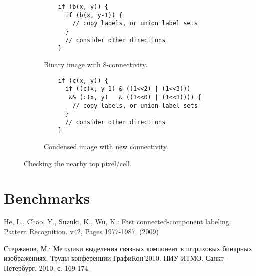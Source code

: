 \documentclass{llncs}
\begin{document}
\begin{figure}
  \centering
  \begin{subfigure}[t]{0.475\linewidth}
    \centering
    \begin{lstlisting}
    if (b(x, y)) {
      if (b(x, y-1)) {
        // copy labels, or union label sets
      }
      // consider other directions
    }
    \end{lstlisting}
    \caption{Binary image with 8-connectivity.}
  \end{subfigure}
  \quad
  \begin{subfigure}[t]{0.475\linewidth}
    \centering
    \begin{lstlisting}
    if (c(x, y)) {
      if ((c(x, y-1) & ((1<<2) | (1<<3)))
       && (c(x, y)   & ((1<<0) | (1<<1)))) {
        // copy labels, or union label sets
      }
      // consider other directions
    }
    \end{lstlisting}
    \caption{Condensed image with new connectivity.}
  \end{subfigure}
  \caption{Checking the nearby top pixel/cell.}
  \label{fig:connectivity:code}
\end{figure}

\section{Benchmarks}

\newcommand{\inputtable}[2]{
  \begin{table}
    \centering
    
    \caption{Noise images $#1 \times #2$ px}
  \end{table} }

\inputtable{400}{600}
\inputtable{800}{1200}
\inputtable{1200}{1800}
\inputtable{2000}{3000}
\inputtable{4000}{6000}

\begin{thebibliography}{5}

He, L., Chao, Y., Suzuki, K., Wu, K.:
Fast connected-component labeling. Pattern Recognition. v42, Pages 1977-1987. (2009)

Стержанов, М.:
Методики выделения связных компонент в штриховых бинарных изображениях.
Труды конференции ГрафиКон’2010. НИУ ИТМО. Санкт-Петербург. 2010, с. 169-174.

\end{thebibliography}
\end{document}
